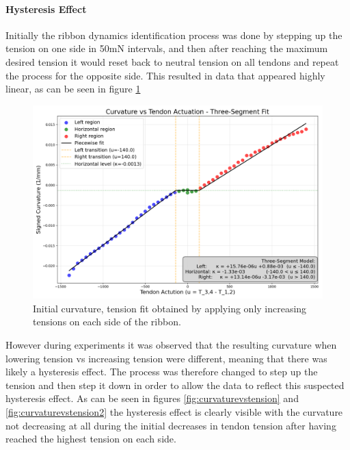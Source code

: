 \paragraph*{Hysteresis Effect}
Initially the ribbon dynamics identification process was done by stepping up the tension on one side in 50mN intervals, and then after reaching the maximum desired tension it would reset back to neutral tension on all tendons and repeat the process for the opposite side. This resulted in data that appeared highly linear, as can be seen in figure \ref{fig:hysteresis}
\begin{figure} [H]
    \centering
    \includegraphics[width=0.9\linewidth]{images/ribbonadapter/Ribbonfit_2025-06-17_17-34-03.png}
    \caption{Initial curvature, tension fit obtained by applying only increasing tensions on each side of the ribbon.}
    \label{fig:hysteresis}
\end{figure}
However during experiments it was observed that the resulting curvature when lowering tension vs increasing tension were different, meaning that there was likely a hysteresis effect. The process was therefore changed to step up the tension and then step it down in order to allow the data to reflect this suspected hysteresis effect. As can be seen in figures \ref{fig:curvaturevstension} and \ref{fig:curvaturevstension2} the hysteresis effect is clearly visible with the curvature not decreasing at all during the initial decreases in tendon tension after having reached the highest tension on each side.


